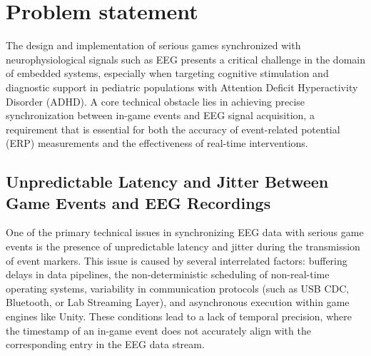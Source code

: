 


\section{Problem statement}
\label{sec:problem} 

The design and implementation of serious games synchronized with neurophysiological signals such as EEG presents a critical challenge in the domain of embedded systems, especially when targeting cognitive stimulation and diagnostic support in pediatric populations with Attention Deficit Hyperactivity Disorder (ADHD). A core technical obstacle lies in achieving precise synchronization between in-game events and EEG signal acquisition, a requirement that is essential for both the accuracy of event-related potential (ERP) measurements and the effectiveness of real-time interventions.



\subsection{Unpredictable Latency and Jitter Between Game Events and EEG Recordings}

One of the primary technical issues in synchronizing EEG data with serious game events is the presence of unpredictable latency and jitter during the transmission of event markers. This issue is caused by several interrelated factors: buffering delays in data pipelines, the non-deterministic scheduling of non-real-time operating systems, variability in communication protocols (such as USB CDC, Bluetooth, or Lab Streaming Layer), and asynchronous execution within game engines like Unity. These conditions lead to a lack of temporal precision, where the timestamp of an in-game event does not accurately align with the corresponding entry in the EEG data stream.

